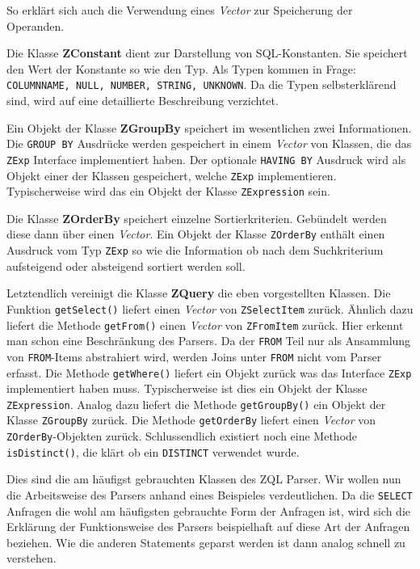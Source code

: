 So erklärt sich auch die Verwendung eines \textit{Vector} zur Speicherung der Operanden.

Die Klasse \textbf{ZConstant} dient zur Darstellung von SQL-Konstanten. Sie speichert den Wert der Konstante so wie den Typ. Als Typen kommen in Frage: \verb|COLUMNNAME, NULL, NUMBER, STRING, UNKNOWN|. Da die Typen selbsterklärend sind, wird auf eine detaillierte Beschreibung verzichtet.

Ein Objekt der Klasse \textbf{ZGroupBy} speichert im wesentlichen zwei Informationen. Die \verb|GROUP BY| Ausdrücke werden gespeichert in einem \textit{Vector} von Klassen, die das \verb|ZExp| Interface implementiert haben. Der optionale \verb|HAVING BY| Ausdruck wird als Objekt einer der Klassen gespeichert, welche \verb|ZExp| implementieren. Typischerweise wird das ein Objekt der Klasse \verb|ZExpression| sein.

Die Klasse \textbf{ZOrderBy} speichert einzelne Sortierkriterien. Gebündelt werden diese dann über einen \textit{Vector}. Ein Objekt der Klasse \verb|ZOrderBy| enthält einen Ausdruck vom Typ \verb|ZExp| so wie die Information ob nach dem Suchkriterium aufsteigend oder absteigend sortiert werden soll.

Letztendlich vereinigt die Klasse \textbf{ZQuery} die eben vorgestellten Klassen. Die Funktion \verb|getSelect()| liefert einen \textit{Vector} von \verb|ZSelectItem| zurück. Ähnlich dazu liefert die Methode \verb|getFrom()| einen \textit{Vector} von \verb|ZFromItem| zurück. Hier erkennt man schon eine Beschränkung des Parsers. Da der \verb|FROM| Teil nur als Ansammlung von \verb|FROM|-Items abstrahiert wird, werden Joins unter \verb|FROM| nicht vom Parser erfasst. Die Methode \verb|getWhere()| liefert ein Objekt zurück was das Interface \verb|ZExp| implementiert haben muss. Typischerweise ist dies ein Objekt der Klasse \verb|ZExpression|. Analog dazu liefert die Methode \verb|getGroupBy()| ein Objekt der Klasse \verb|ZGroupBy| zurück. Die Methode \verb|getOrderBy| liefert einen \textit{Vector} von \verb|ZOrderBy|-Objekten zurück.
Schlussendlich existiert noch eine Methode \verb|isDistinct()|, die klärt ob ein \verb|DISTINCT| verwendet wurde.

Dies sind die am häufigst gebrauchten Klassen des ZQL Parser. Wir wollen nun die Arbeitsweise des Parsers anhand eines Beispieles verdeutlichen. Da die \verb|SELECT| Anfragen die wohl am häufigsten gebrauchte Form der Anfragen ist, wird sich die Erklärung der Funktionsweise des Parsers beispielhaft auf diese Art der Anfragen beziehen. Wie die anderen Statements geparst werden ist dann analog schnell zu verstehen.


